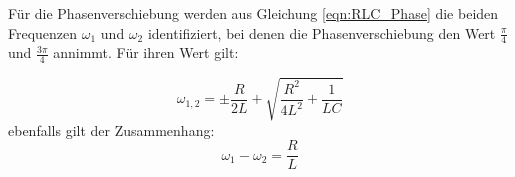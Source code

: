 Für die Phasenverschiebung werden aus Gleichung \eqref{eqn:RLC_Phase} die beiden Frequenzen $\omega_1$ und $\omega_2$ identifiziert, bei denen
die Phasenverschiebung den Wert $\frac{\pi}{4}$ und $\frac{3\pi}{4}$ annimmt. Für ihren Wert gilt:

\begin{equation}
    \label{eqn:w_1_w_2}
    \omega_{1,2} = \pm \frac{R}{2L} + \sqrt{\frac{R^2}{4L^2}+\frac{1}{LC}}
\end{equation}
ebenfalls gilt der Zusammenhang:
\begin{equation}
    \label{eqn:w_1_w_2_2}
    \omega_1 - \omega_2 = \frac{R}{L}
\end{equation}